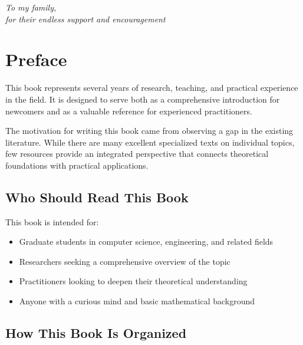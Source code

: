 \documentclass[11pt,twoside,openright]{book}
\theoremstyle{plain}
\theoremstyle{definition}
\theoremstyle{remark}
\begin{document}
\thispagestyle{empty}
\vspace*{\fill}
\begin{center}
    \itshape
    To my family, \\
    for their endless support and encouragement
\end{center}
\vspace*{\fill}
\cleardoublepage

\tableofcontents
\cleardoublepage

\listoffigures
\cleardoublepage

\listoftables
\cleardoublepage

\chapter*{Preface}

This book represents several years of research, teaching, and practical experience in the field. It is designed to serve both as a comprehensive introduction for newcomers and as a valuable reference for experienced practitioners.

The motivation for writing this book came from observing a gap in the existing literature. While there are many excellent specialized texts on individual topics, few resources provide an integrated perspective that connects theoretical foundations with practical applications.

\section*{Who Should Read This Book}

This book is intended for:

\begin{itemize}[itemsep=0.3em]
    \item Graduate students in computer science, engineering, and related fields
    \item Researchers seeking a comprehensive overview of the topic
    \item Practitioners looking to deepen their theoretical understanding
    \item Anyone with a curious mind and basic mathematical background
\end{itemize}

\section*{How This Book Is Organized}
\end{document}
